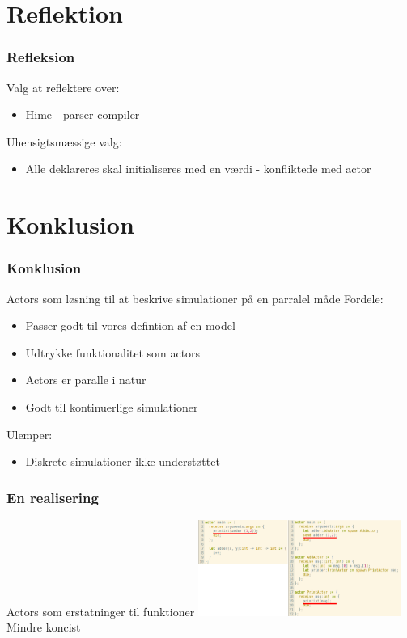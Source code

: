 \section{Reflektion}
\begin{frame}
	\frametitle{Refleksion}
	Valg at reflektere over:
	  \begin{itemize}
	    \item{Hime - parser compiler}
	  \end{itemize}
  Uhensigtsmæssige valg:
	  \begin{itemize}
	    \item Alle deklareres skal initialiseres med en værdi - konfliktede med actor
	  \end{itemize}
\end{frame}

\section{Konklusion}
\begin{frame}
	\frametitle{Konklusion}
	Actors som løsning til at beskrive simulationer på en parralel måde
  Fordele:
    \begin{itemize}
      \item Passer godt til vores defintion af en model
      \item Udtrykke funktionalitet som actors
      \item Actors er paralle i natur
      \item Godt til kontinuerlige simulationer
    \end{itemize}
  Ulemper:
    \begin{itemize}
      \item Diskrete simulationer ikke understøttet
    \end{itemize}
\end{frame}

\begin{frame}
	\frametitle{En realisering}
	Actors som erstatninger til funktioner
	\includegraphics[width=250px]{Images/actorFunc.png}\newline
	Mindre koncist
\end{frame}


